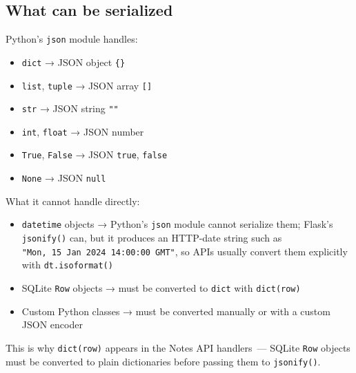 \subsection*{What can be serialized}\label{05-internal-request-execution:what-can-be-serialized}

Python's \texttt{json} module handles:

\begin{itemize}
\tightlist
\item
  \texttt{dict} → JSON object \texttt{\{\}}
\item
  \texttt{list}, \texttt{tuple} → JSON array \texttt{{[}{]}}
\item
  \texttt{str} → JSON string \texttt{""}
\item
  \texttt{int}, \texttt{float} → JSON number
\item
  \texttt{True}, \texttt{False} → JSON \texttt{true}, \texttt{false}
\item
  \texttt{None} → JSON \texttt{null}
\end{itemize}

\noindent{}What it cannot handle directly:

\begin{itemize}
\tightlist
\item
  \texttt{datetime} objects → Python's \texttt{json} module cannot serialize them; Flask's \texttt{jsonify()} can, but it produces an HTTP-date string such as \texttt{"Mon,}\allowbreak{}\texttt{\ 15\ Jan\ 2024\ 14:}\allowbreak{}\texttt{00:}\allowbreak{}\texttt{00\ GMT"}, so APIs usually convert them explicitly with \texttt{dt.isoformat()}
\item
  SQLite \texttt{Row} objects → must be converted to \texttt{dict} with \texttt{dict(row)}
\item
  Custom Python classes → must be converted manually or with a custom JSON encoder
\end{itemize}

\noindent{}This is why \texttt{dict(row)} appears in the Notes API handlers~--- SQLite \texttt{Row} objects must be converted to plain dictionaries before passing them to \texttt{jsonify()}.

